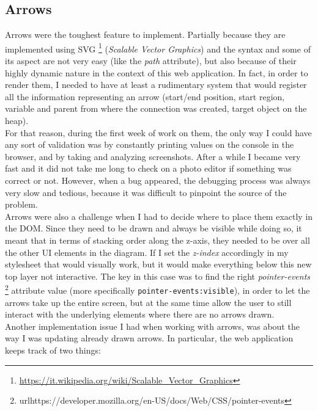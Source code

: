\documentclass[]{usiinfbachelorproject}
\begin{document}
\subsection{Arrows}

Arrows were the toughest feature to implement. Partially because they are implemented using SVG \footnote{\url{https://it.wikipedia.org/wiki/Scalable_Vector_Graphics}} (\emph{Scalable Vector Graphics}) and the syntax and some of its aspect are not very easy (like the \emph{path} attribute), but also because of their highly dynamic nature in the context of this web application. In fact, in order to render them, I needed to have at least a rudimentary system that would register all the information representing an arrow (start/end position, start region, variable and parent from where the connection was created, target object on the heap).\\For that reason, during the first week of work on them, the only way I could have any sort of validation was by constantly printing values on the console in the browser, and by taking and analyzing screenshots. After a while I became very fast and it did not take me long to check on a photo editor if something was correct or not. However, when a bug appeared, the debugging process was always very slow and tedious, because it was difficult to pinpoint the source of the problem.\\

\noindent Arrows were also a challenge when I had to decide where to place them exactly in the DOM. Since they need to be drawn and always be visible while doing so, it meant that in terms of stacking order along the z-axis, they needed to be over all the other UI elements in the diagram. If I set the \emph{z-index} accordingly in my stylesheet that would visually work, but it would make everything below this new top layer not interactive. The key in this case was to find the right \emph{pointer-events} \footnote{url{https://developer.mozilla.org/en-US/docs/Web/CSS/pointer-events}} attribute value (more specifically \texttt{pointer-events:visible}), in order to let the arrows take up the entire screen, but at the same time allow the user to still interact with the underlying elements where there are no arrows drawn.\\

\noindent Another implementation issue I had when working with arrows, was about the way I was updating already drawn arrows. In particular, the web application keeps track of two things:
\end{document}
